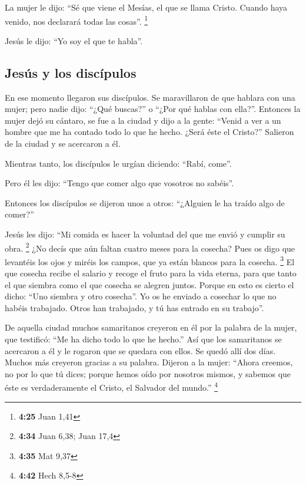 \begin{paracol}{2}
 La mujer le dijo: ``Sé que viene el Mesías, el que se
llama Cristo. Cuando haya venido, nos declarará todas las cosas''.
\footnote{\textbf{4:25} Juan 1,41}

 Jesús le dijo: ``Yo soy el que te habla''.

\hypertarget{jesuxfas-y-los-discuxedpulos}{%
\subsection{Jesús y los discípulos}\label{jesuxfas-y-los-discuxedpulos}}

 En ese momento llegaron sus discípulos. Se maravillaron
de que hablara con una mujer; pero nadie dijo: ``¿Qué buscas?'' o ``¿Por
qué hablas con ella?''.  Entonces la mujer dejó su
cántaro, se fue a la ciudad y dijo a la gente:  ``Venid a
ver a un hombre que me ha contado todo lo que he hecho. ¿Será éste el
Cristo?''  Salieron de la ciudad y se acercaron a él.

 Mientras tanto, los discípulos le urgían diciendo:
``Rabí, come''.

 Pero él les dijo: ``Tengo que comer algo que vosotros no
sabéis''.

 Entonces los discípulos se dijeron unos a otros:
``¿Alguien le ha traído algo de comer?''

 Jesús les dijo: ``Mi comida es hacer la voluntad del que
me envió y cumplir su obra. \footnote{\textbf{4:34} Juan 6,38; Juan 17,4}
 ¿No decís que aún faltan cuatro meses para la cosecha?
Pues os digo que levantéis los ojos y miréis los campos, que ya están
blancos para la cosecha. \footnote{\textbf{4:35} Mat 9,37}
 El que cosecha recibe el salario y recoge el fruto para
la vida eterna, para que tanto el que siembra como el que cosecha se
alegren juntos.  Porque en esto es cierto el dicho: ``Uno
siembra y otro cosecha''.  Yo os he enviado a cosechar lo
que no habéis trabajado. Otros han trabajado, y tú has entrado en su
trabajo''.

 De aquella ciudad muchos samaritanos creyeron en él por
la palabra de la mujer, que testificó: ``Me ha dicho todo lo que he
hecho.''  Así que los samaritanos se acercaron a él y le
rogaron que se quedara con ellos. Se quedó allí dos días.
 Muchos más creyeron gracias a su palabra.
 Dijeron a la mujer: ``Ahora creemos, no por lo que tú
dices; porque hemos oído por nosotros mismos, y sabemos que éste es
verdaderamente el Cristo, el Salvador del mundo.'' \footnote{\textbf{4:42}
  Hech 8,5-8}


\end{paracol}
